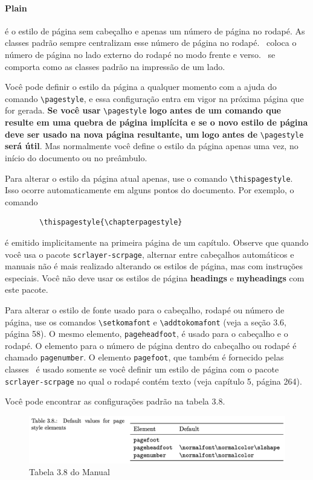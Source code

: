 \paragraph{Plain} é o estilo de página sem cabeçalho e apenas um número de página no rodapé. As classes padrão sempre centralizam esse número de página no rodapé. \KOMAScript\ coloca o número de página no lado externo do rodapé no modo frente e verso. \KOMAScript\ se comporta como as classes padrão na impressão de um lado.

Você pode definir o estilo da página a qualquer momento com a ajuda do comando \verb|\pagestyle|, e essa configuração entra em vigor na próxima página que for gerada. \textbf{Se você usar} \verb|\pagestyle| \textbf{logo antes de um comando que resulte em uma quebra de página implícita e se o novo estilo de página deve ser usado na nova página resultante, um}  \textbf{logo antes de} \verb|\pagestyle| \textbf{será útil}. Mas normalmente você define o estilo da página apenas uma vez, no início do documento ou no preâmbulo.

Para alterar o estilo da página atual apenas, use o comando \verb|\thispagestyle|. Isso ocorre automaticamente em alguns pontos do documento. Por exemplo, o comando
\begin{verbatim}
        \thispagestyle{\chapterpagestyle}   
\end{verbatim}

é emitido implicitamente na primeira página de um capítulo.
Observe que quando você usa o pacote \texttt{scrlayer-scrpage}, alternar entre cabeçalhos automáticos e manuais não é mais realizado alterando os estilos de página, mas com instruções especiais. Você não deve usar os estilos de página \textbf{headings} e \textbf{myheadings} com este pacote.

Para alterar o estilo de fonte usado para o cabeçalho, rodapé ou número de página, use os comandos \verb|\setkomafont| e \verb|\addtokomafont| (veja a seção 3.6, página 58). O mesmo elemento, \texttt{pageheadfoot}, é usado para o cabeçalho e o rodapé. O elemento para o número de página dentro do cabeçalho ou rodapé é chamado \texttt{pagenumber}. O elemento \texttt{pagefoot}, que também é fornecido pelas classes \KOMAScript\ é usado somente se você definir um estilo de página com o pacote \texttt{scrlayer-scrpage} no qual o rodapé contém texto (veja capítulo 5, página 264).

Você pode encontrar as configurações padrão na tabela 3.8.

\begin{figure}[h]
    \centering
    \includegraphics[width=0.9\linewidth]{imagens/tab3_8.png}
    \caption{Tabela 3.8 do Manual}
    \label{fig:tab3_8}
\end{figure}

